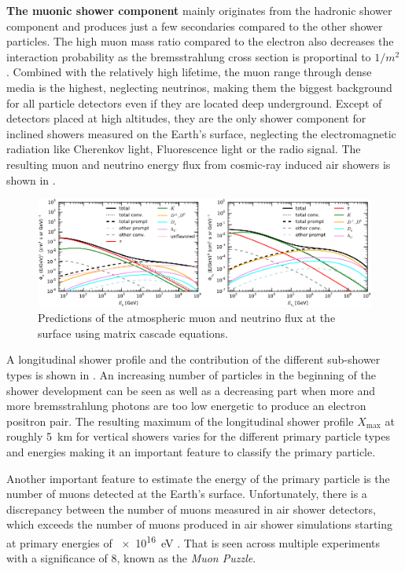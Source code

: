 \textbf{The muonic shower component} mainly originates from the hadronic shower component and produces just a few secondaries compared to the other shower particles.
The high muon mass ratio compared to the electron also decreases the interaction probability as the bremsstrahlung cross section is proportinal to $1/m^2$.
Combined with the relatively high lifetime, the muon range through dense media is the highest, neglecting neutrinos, making them the biggest background for all particle detectors even if they are located deep underground.
Except of detectors placed at high altitudes, they are the only shower component for inclined showers measured on the Earth's surface, neglecting the electromagnetic radiation like Cherenkov light, Fluorescence light or the radio signal.
The resulting muon and neutrino energy flux from cosmic-ray induced air showers is shown in .
\begin{figure}
    \centering
    \includegraphics[width=\textwidth]{./images/mceq_mu_nu_flux.pdf}
    \caption{Predictions of the atmospheric muon and neutrino flux at the surface using matrix cascade equations. \cite{Fedynitch15MCEq}}
    \label{fig:atmo_mu_nu_flux}
\end{figure}

A longitudinal shower profile and the contribution of the different sub-shower types is shown in .
An increasing number of particles in the beginning of the shower development can be seen as well as a decreasing part when more and more bremsstrahlung photons are too low energetic to produce an electron positron pair.
The resulting maximum of the longitudinal shower profile $X_{\mathrm{max}}$ at roughly \SI{5}{km} for vertical showers varies for the different primary particle types and energies making it an important feature to classify the primary particle.

Another important feature to estimate the energy of the primary particle is the number of muons detected at the Earth's surface.
Unfortunately, there is a discrepancy between the number of muons measured in air shower detectors, which exceeds the number of muons produced in air shower simulations starting at primary energies of \SI{e16}{eV} \cite{Dembinski19MuonPuzzle}.
That is seen across multiple experiments with a significance of \SI{8}{\sigma}, known as the \textit{Muon Puzzle}.

